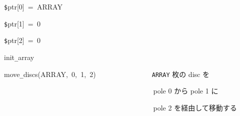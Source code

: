 \documentclass[a4paper,10pt]{article}
\def\mc{\relax}
\begin{document}
\noindent
\mbox{}\hfill

\noindent
\mbox{}{\tt\$}ptr[0]{\tt\mc \ }={\tt\mc \ }ARRAY

\noindent
\mbox{}{\tt\$}ptr[1]{\tt\mc \ }={\tt\mc \ }0

\noindent
\mbox{}{\tt\$}ptr[2]{\tt\mc \ }={\tt\mc \ }0

\noindent
\mbox{}\hfill

\noindent
\mbox{}init{\tt\_}array

\noindent
\mbox{}move{\tt\_}discs(ARRAY,{\tt\mc \ }0,{\tt\mc \ }1,{\tt\mc \ }2){\tt\mc \ }{\tt\mc \ }{\tt\mc \ }{\tt\mc \ }{\tt\mc \ }{\tt\mc \ }{\tt\mc \ }{\tt\mc \ }{\tt\mc \ }{\tt\mc \ }{\tt\mc \ }{\tt\mc \ }{\tt\mc \ }{\tt\mc \ }\rm\mc {\tt\#} \ {\tt ARRAY} 枚の disc を \hfill 
\tt\mc 

\noindent
\mbox{}{\tt\mc \ }{\tt\mc \ }{\tt\mc \ }{\tt\mc \ }{\tt\mc \ }{\tt\mc \ }{\tt\mc \ }{\tt\mc \ }{\tt\mc \ }{\tt\mc \ }{\tt\mc \ }{\tt\mc \ }{\tt\mc \ }{\tt\mc \ }{\tt\mc \ }{\tt\mc \ }{\tt\mc \ }{\tt\mc \ }{\tt\mc \ }{\tt\mc \ }{\tt\mc \ }{\tt\mc \ }{\tt\mc \ }{\tt\mc \ }{\tt\mc \ }{\tt\mc \ }{\tt\mc \ }{\tt\mc \ }{\tt\mc \ }{\tt\mc \ }{\tt\mc \ }{\tt\mc \ }{\tt\mc \ }{\tt\mc \ }{\tt\mc \ }{\tt\mc \ }{\tt\mc \ }{\tt\mc \ }{\tt\mc \ }{\tt\mc \ }\rm\mc {\tt\#} \ pole 0 から pole 1 に \hfill 
\tt\mc 

\noindent
\mbox{}{\tt\mc \ }{\tt\mc \ }{\tt\mc \ }{\tt\mc \ }{\tt\mc \ }{\tt\mc \ }{\tt\mc \ }{\tt\mc \ }{\tt\mc \ }{\tt\mc \ }{\tt\mc \ }{\tt\mc \ }{\tt\mc \ }{\tt\mc \ }{\tt\mc \ }{\tt\mc \ }{\tt\mc \ }{\tt\mc \ }{\tt\mc \ }{\tt\mc \ }{\tt\mc \ }{\tt\mc \ }{\tt\mc \ }{\tt\mc \ }{\tt\mc \ }{\tt\mc \ }{\tt\mc \ }{\tt\mc \ }{\tt\mc \ }{\tt\mc \ }{\tt\mc \ }{\tt\mc \ }{\tt\mc \ }{\tt\mc \ }{\tt\mc \ }{\tt\mc \ }{\tt\mc \ }{\tt\mc \ }{\tt\mc \ }{\tt\mc \ }\rm\mc {\tt\#} \ pole 2 を経由して移動する \hfill 

\tt\mc 

\rm\mc
\end{document}
